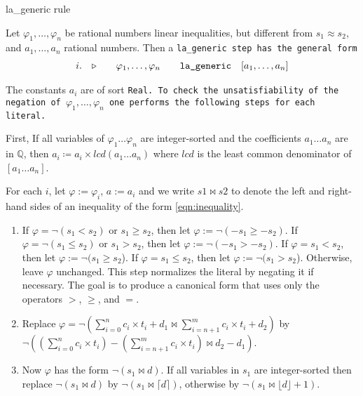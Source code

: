\begin{algorithm}[!t]%
\caption{la\_generic rule}\label{alg:la-generic-description}
Let $\varphi_1,\dots, \varphi_n$ be rational numbers linear inequalities, but different from $s_1 \approx s_2$, and $a_1, \dots, a_n$ rational numbers. Then a \tt{la\_generic} step has the general form
%
\[
\begin{matrix*}[c]
  i. & \ctxsep \quad & \varphi_1 , \dots , \varphi_n & \quad \tt{la\_generic}  & [a_1, \dots, a_n] \\
\end{matrix*}
\]

The constants $a_i$ are of sort \tt{Real}. To check the unsatisfiability of the negation of $\varphi_1, \dots, \varphi_n$ one performs the following steps for each literal.

First, If all variables of $\varphi_1 \dots \varphi_n$ are integer-sorted and the coefficients $a_1 \dots a_n$ are in $\mathbb{Q}$,
then $a_i \coloneq a_i \times \mathit{lcd}(a_1 \dots a_n)$ where $\mathit{lcd}$ is the least common denominator of $[a_1 \dots a_n]$.

For each $i$, let $\varphi := \varphi_i$, $a := a_i$ and
we write $s1 \bowtie s2$ to denote the left and right-hand sides of an inequality of the form \eqref{eqn:inequality}.


\begin{enumerate}
    \item If $\varphi =  \neg (s_1 < s_2)$  or $s_1 \geq s_2$, then let $\varphi := \neg(- s_1 \geq - s_2)$.
    If $\varphi =  \neg (s_1 \leq s_2)$ or $s_1 > s_2$, then let $\varphi := \neg(- s_1 > - s_2)$.
    If $\varphi = s_1 < s_2$, then let $\varphi := \neg(s_1 \geq s_2$).
    If $\varphi = s_1 \leq s_2$, then let $\varphi := \neg(s_1 > s_2$).
    Otherwise, leave $\varphi$ unchanged.
    This step normalizes the literal by negating it if necessary.
    The goal is to produce a canonical form that uses only the operators $>$, $\geq$, and $=$.\\


    \item Replace $\varphi = \neg (\sum_{i=0}^{n}c_i\times{}t_i + d_1 \bowtie \sum_{i=n+1}^{m} c_i\times{}t_i + d_2)$ by $\neg (\left(\sum_{i=0}^{n}c_i\times{}t_i\right) - \left(\sum_{i=n+1}^{m} c_i\times{}t_i\right)
    \bowtie d_2 - d_1)$.

    \item \label{la_generic:str}Now $\varphi$ has the form $\neg (s_1 \bowtie d)$. If all
    variables in $s_1$ are integer-sorted then replace $\neg (s_1 \bowtie d)$ by $\neg (s_1 \bowtie \lceil d \rceil)$,
    otherwise by $\neg (s_1 \bowtie \lfloor d\rfloor + 1)$.


\end{enumerate}
\end{algorithm}

